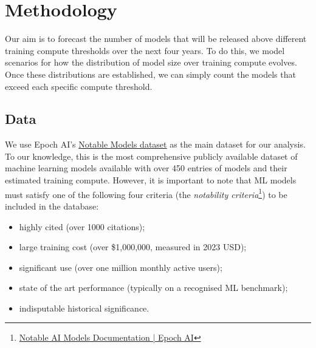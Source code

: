 \documentclass[11pt]{article}
\begin{document}
\section{Methodology}

Our aim is to forecast the number of models that will be released above different training compute thresholds over the next four years. To do this, we model scenarios for how the distribution of model size over training compute evolves. Once these distributions are established, we can simply count the models that exceed each specific compute threshold.

\subsection{Data}

We use Epoch AI's \underline{\href{https://epoch.ai/data/notable-ai-models-documentation#:~:text=Changelog\%20Downloads\%20Acknowledgements-,Overview,and\%20future\%20of\%20artificial\%20intelligence.}{Notable Models dataset}} as the main dataset for our analysis. To our knowledge, this is the most comprehensive publicly available dataset of machine learning models available with over 450 entries of models and their estimated training compute. However, it is important to note that ML models must satisfy one of the following four criteria (the \textit{notability criteria}\footnote{\href{https://epoch.ai/data/notable-ai-models-documentation#inclusion}{Notable AI Models Documentation | Epoch AI}}) to be included in the database:

\begin{itemize}
\item highly cited (over 1000 citations);
\item large training cost (over \$1,000,000, measured in 2023 USD);
\item significant use (over one million monthly active users);
\item state of the art performance (typically on a recognised ML benchmark);
\item indisputable historical significance.
\end{itemize}
\end{document}
